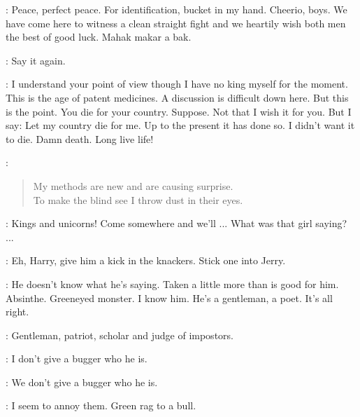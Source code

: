 \EdwardSeventh:
Peace, perfect peace.
For identification, bucket in my hand.
Cheerio, boys.
We have come here to witness a clean straight fight
and we heartily wish both men the best of good luck.
Mahak makar a bak.


\Carr:
Say it again.

\Stephen:
I understand your point of view though I have no king myself for the moment.
This is the age of patent medicines.
A discussion is difficult down here.
But this is the point.
You die for your country.
Suppose.
Not that I wish it for you.
But I say: Let my country die for me.
Up to the  present it has done so.
I didn't want it to die.
Damn death.
Long live life!

\EdwardSeventh:
\begin{verse}
    My methods are new and are causing surprise.\\
    To make the blind see I throw dust in their eyes.
\end{verse}

\Stephen:
Kings and unicorns!
Come somewhere and we'll ...
What was that girl saying? ...

\Compton:
Eh, Harry, give him a kick in the knackers.
Stick one into Jerry.

\Bloom:
He doesn't know what he's saying.
Taken a little more than is good for him.
Absinthe.
Greeneyed monster.
I know him.
He's a gentleman, a poet.
It's all right.

\Stephen:
Gentleman, patriot, scholar and judge of impostors.

\Carr:
I don't give a bugger who he is.

\Compton:
We don't give a bugger who he is.

\Stephen:
I seem to annoy them.
Green rag to a bull.


